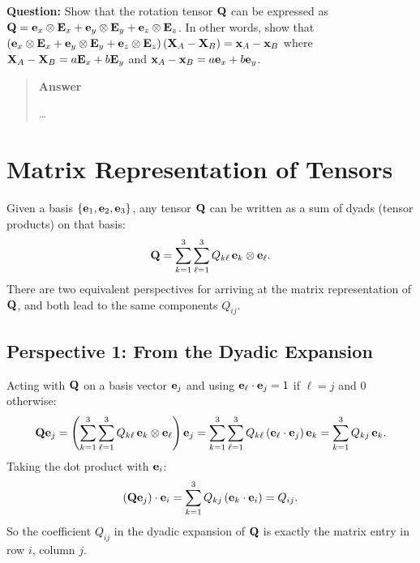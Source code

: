 \documentclass[
  letterpaper,
  DIV=11,
  numbers=noendperiod]{scrreprt}
\newcommand{\lp}{\left(}
\newcommand{\rp}{\right)}
\begin{document}
\begin{tcolorbox}[enhanced jigsaw, arc=.35mm, bottomrule=.15mm, bottomtitle=1mm, breakable, colback=white, colbacktitle=quarto-callout-tip-color!10!white, colframe=quarto-callout-tip-color-frame, coltitle=black, left=2mm, leftrule=.75mm, opacityback=0, opacitybacktitle=0.6, rightrule=.15mm, title=\textcolor{quarto-callout-tip-color}{\faLightbulb}\hspace{0.5em}{Think!}, titlerule=0mm, toprule=.15mm, toptitle=1mm]

\textbf{Question:} Show that the rotation tensor \({\bf Q}\) can be
expressed as
\({\bf Q} = {\bf e}_x\otimes{\bf E}_x+{\bf e}_y\otimes{\bf E}_y+{\bf e}_z\otimes{\bf E}_z\).
In other words, show that
\(\lp {\bf e}_x\otimes{\bf E}_x+{\bf e}_y\otimes{\bf E}_y+{\bf e}_z\otimes{\bf E}_z\rp\lp{\bf X}_A-{\bf X}_B\rp = {\bf x}_A-{\bf x}_B\)
where \({\bf X}_A-{\bf X}_B = a{\bf E}_x+b{\bf E}_y\) and
\({\bf x}_A-{\bf x}_B = a{\bf e}_x+b{\bf e}_y\).

\begin{quote}
\textbf{Answer}

\ldots{}
\end{quote}

\end{tcolorbox}

\section{Matrix Representation of
Tensors}\label{matrix-representation-of-tensors}

Given a basis \(\{{\bf e}_1,{\bf e}_2,{\bf e}_3\}\), any tensor
\({\bf Q}\) can be written as a sum of dyads (tensor products) on that
basis: \begin{align}
    {\bf Q} = \sum_{k=1}^3\sum_{\ell=1}^3 Q_{k\ell}\,{\bf e}_k\otimes{\bf e}_\ell.
\end{align} There are two equivalent perspectives for arriving at the
matrix representation of \({\bf Q}\), and both lead to the same
components \(Q_{ij}\).

\subsection{Perspective 1: From the Dyadic
Expansion}\label{perspective-1-from-the-dyadic-expansion}

Acting with \({\bf Q}\) on a basis vector \({\bf e}_j\) and using
\({\bf e}_\ell\cdot{\bf e}_j = 1\) if \(\ell=j\) and \(0\) otherwise:
\begin{align}
    {\bf Q}{\bf e}_j = \lp\sum_{k=1}^3\sum_{\ell=1}^3 Q_{k\ell}\,{\bf e}_k\otimes{\bf e}_\ell\rp{\bf e}_j = \sum_{k=1}^3\sum_{\ell=1}^3 Q_{k\ell}\lp{\bf e}_\ell\cdot{\bf e}_j\rp{\bf e}_k = \sum_{k=1}^3 Q_{kj}\,{\bf e}_k.
\end{align} Taking the dot product with \({\bf e}_i\): \begin{align}
    \lp{\bf Q}{\bf e}_j\rp\cdot{\bf e}_i = \sum_{k=1}^3 Q_{kj}\lp{\bf e}_k\cdot{\bf e}_i\rp = Q_{ij}.
\end{align} So the coefficient \(Q_{ij}\) in the dyadic expansion of
\({\bf Q}\) is exactly the matrix entry in row \(i\), column \(j\).
\end{document}
